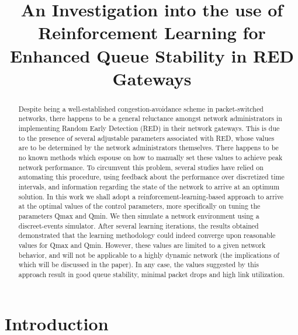 \documentclass[conference, 10pt]{IEEEtran}
\begin{document}
	
	\title{An Investigation into the use of Reinforcement Learning for Enhanced Queue Stability in RED Gateways \vspace{-2ex}}
	\author{
	\vspace{1ex}}
	\maketitle
	
	\begin{abstract}
	Despite being a well-established congestion-avoidance scheme in packet-switched networks, there happens to be a general reluctance amongst network administrators in implementing Random Early Detection (RED) in their network gateways. This is due to the presence of several adjustable parameters associated with RED, whose values are to be determined by the network administrators themselves. There happens to be no known methods which espouse on how to manually set these values to achieve peak network performance. To circumvent this problem, several studies have relied on automating this procedure, using feedback about the performance over discretized time intervals, and information regarding the state of the network to arrive at an optimum solution. In this work we shall adopt a reinforcement-learning-based approach to arrive at the optimal values of the control parameters, more specifically on tuning the parameters Qmax and Qmin. We then simulate a network environment using a discreet-events simulator. After several learning iterations, the results obtained demonstrated that the learning methodology could indeed converge upon reasonable values for Qmax and Qmin. However, these values are limited to a given network behavior, and will not be applicable to a highly dynamic network (the implications of which will be discussed in the paper). In any case, the values suggested by this approach result in good queue stability, minimal packet drops and high link utilization.        
	\end{abstract}

\section{Introduction}
\label{sec:intro}
\end{document}
